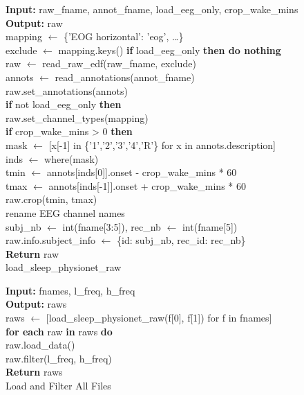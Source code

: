 \begin{algorithm}
	\textbf{Input:} raw\_fname, annot\_fname, load\_eeg\_only, crop\_wake\_mins\\
	\textbf{Output:} raw\\
	
	mapping $\gets$ \{'EOG horizontal': 'eog', \dots\}\\
	exclude $\gets$ mapping.keys() \textbf{if} load\_eeg\_only \textbf{then do nothing}\\
	raw $\gets$ read\_raw\_edf(raw\_fname, exclude)\\
	annots $\gets$ read\_annotations(annot\_fname)\\
	raw.set\_annotations(annots)\\
	\textbf{if} not load\_eeg\_only \textbf{then}\\
	\hspace{1cm} raw.set\_channel\_types(mapping)\\
	\textbf{if} crop\_wake\_mins > 0 \textbf{then}\\
	\hspace{1cm} mask $\gets$ [x[-1] in \{'1','2','3','4','R'\} for x in annots.description]\\
	\hspace{1cm} inds $\gets$ where(mask)\\
	\hspace{1cm} tmin $\gets$ annots[inds[0]].onset - crop\_wake\_mins * 60\\
	\hspace{1cm} tmax $\gets$ annots[inds[-1]].onset + crop\_wake\_mins * 60\\
	\hspace{1cm} raw.crop(tmin, tmax)\\
	rename EEG channel names\\
	subj\_nb $\gets$ int(fname[3:5]), rec\_nb $\gets$ int(fname[5])\\
	raw.info.subject\_info $\gets$ \{id: subj\_nb, rec\_id: rec\_nb\}\\
	\textbf{Return} raw\\
	\caption{load\_sleep\_physionet\_raw}
\end{algorithm}

\begin{algorithm}
	\textbf{Input:} fnames, l\_freq, h\_freq\\
	\textbf{Output:} raws\\
	
	raws $\gets$ [load\_sleep\_physionet\_raw(f[0], f[1]) for f in fnames]\\
	\textbf{for each} raw \textbf{in} raws \textbf{do}\\
	\hspace{1cm} raw.load\_data()\\
	\hspace{1cm} raw.filter(l\_freq, h\_freq)\\
	\textbf{Return} raws\\
	\caption{Load and Filter All Files}
\end{algorithm}

